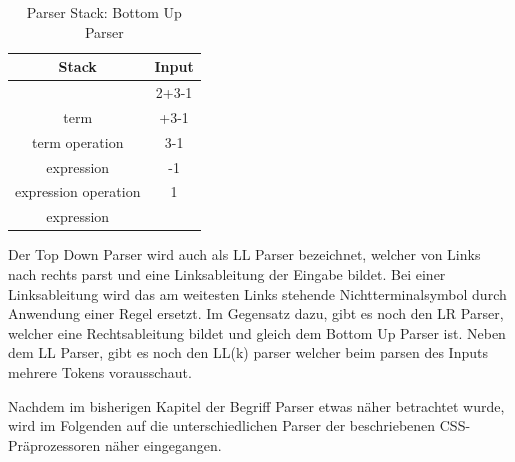 \begin{table}[h]
          \centering
          \begin{tabular}{|c|c|} \hline
                  \textbf{Stack} & \textbf{Input}\\
                   \hline
                     & 2+3-1\\ \hline
                    term & +3-1\\ \hline
                    term operation &3-1\\ \hline
                    expression & -1\\ \hline
	         expression operation & 1\\ \hline
	        expression & \\ \hline
          \end{tabular}
          \caption{
	       Parser Stack: Bottom Up Parser
          }
         \label{table:Vergleich Browser}
\end{table}\autocite[]{Garsiel.}\newline\newline
Der Top Down Parser wird auch als LL Parser bezeichnet, welcher von Links nach rechts parst und eine Linksableitung der Eingabe bildet. Bei einer Linksableitung wird das am weitesten Links stehende Nichtterminalsymbol durch Anwendung einer Regel ersetzt. Im Gegensatz dazu, gibt es noch den LR Parser, welcher eine Rechtsableitung bildet und gleich dem Bottom Up Parser ist.\newline
Neben dem LL Parser, gibt es noch den LL(k) parser welcher beim parsen des Inputs mehrere Tokens vorausschaut. 

Nachdem im bisherigen Kapitel der Begriff Parser etwas näher betrachtet wurde, wird im Folgenden auf die unterschiedlichen Parser der beschriebenen CSS-Präprozessoren näher eingegangen.\newline\newline

